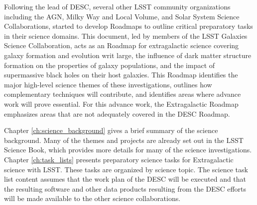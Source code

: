 {Following the lead of DESC, several other LSST community organizations 
including the AGN, Milky Way and Local Volume, and Solar System Science
Collaborations,
started to develop Roadmaps to outline critical preparatory tasks in
their science domains.
This document, led by members of the LSST Galaxies Science Collaboration, 
acts as an Roadmap for extragalactic science covering
galaxy formation and evolution writ large, the influence of dark matter structure
formation on the properties of galaxy populations, and the impact of supermassive
black holes on their host galaxies.
This Roadmap identifies the major high-level
science themes of these investigations, outlines how complementary techniques
will contribute, and identifies areas where advance work will prove essential. For this
advance work, the Extragalactic Roadmap emphasizes areas that are not adequately 
covered in the DESC Roadmap. 

Chapter \ref{ch:science_background} gives a brief summary of the science background.
Many of the themes and projects are already set out in the LSST Science Book, 
which provides more details for many of the science investigations. 
Chapter \ref{ch:task_lists} presents preparatory science tasks for 
Extragalactic science with LSST. These tasks are organized by science topic.
The science task list content assumes that the work plan of the DESC will be executed
and that the resulting software and other data products resulting from the DESC
efforts will be made available to the other science collaborations.
}
\let\cleardoublepage\clearpage


